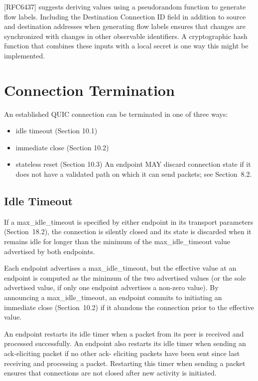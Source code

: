 \documentclass{article}
\begin{document}
[RFC6437] suggests deriving values using a pseudorandom function to generate flow labels.  Including the Destination Connection ID field in addition to source and destination addresses when generating flow labels ensures that changes are synchronized with changes in other observable identifiers.  A cryptographic hash function that combines these inputs with a local secret is one way this might be implemented.

\section{Connection Termination}

An established QUIC connection can be terminated in one of three ways:

\begin{itemize}
\item idle timeout (Section 10.1)
\item immediate close (Section 10.2)
\item stateless reset (Section 10.3)
An endpoint MAY discard connection state if it does not have a validated path on which it can send packets; see Section~8.2.

\end{itemize}
\subsection{Idle Timeout}

If a max\_idle\_timeout is specified by either endpoint in its transport parameters (Section~18.2), the connection is silently closed and its state is discarded when it remains idle for longer than the minimum of the max\_idle\_timeout value advertised by both endpoints.

Each endpoint advertises a max\_idle\_timeout, but the effective value at an endpoint is computed as the minimum of the two advertised values (or the sole advertised value, if only one endpoint advertises a non-zero value).  By announcing a max\_idle\_timeout, an endpoint commits to initiating an immediate close (Section~10.2) if it abandons the connection prior to the effective value.

An endpoint restarts its idle timer when a packet from its peer is received and processed successfully.  An endpoint also restarts its idle timer when sending an ack-eliciting packet if no other ack- eliciting packets have been sent since last receiving and processing a packet.  Restarting this timer when sending a packet ensures that connections are not closed after new activity is initiated.
\end{document}
